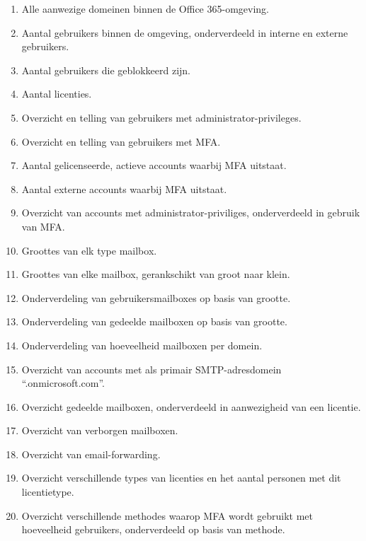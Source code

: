 \begin{enumerate}
    \item Alle aanwezige domeinen binnen de Office 365-omgeving.
    \item Aantal gebruikers binnen de omgeving, onderverdeeld in interne en externe gebruikers.
    \item Aantal gebruikers die geblokkeerd zijn.
    \item Aantal licenties.
    \item Overzicht en telling van gebruikers met administrator-privileges.
    \item Overzicht en telling van gebruikers met \ac{MFA}.
    \item Aantal gelicenseerde, actieve accounts waarbij \ac{MFA} uitstaat.
    \item Aantal externe accounts waarbij \ac{MFA} uitstaat.
    \item Overzicht van accounts met administrator-priviliges, onderverdeeld in gebruik van \ac{MFA}.
    \item Groottes van elk type mailbox.
    \item Groottes van elke mailbox, gerankschikt van groot naar klein.
    \item Onderverdeling van gebruikersmailboxes op basis van grootte.
    \item Onderverdeling van gedeelde mailboxen op basis van grootte.
    \item Onderverdeling van hoeveelheid mailboxen per domein.
    \item Overzicht van accounts met als primair \Ac{SMTP}-adresdomein “.onmicrosoft.com”.
    \item Overzicht gedeelde mailboxen, onderverdeeld in aanwezigheid van een licentie.
    \item Overzicht van verborgen mailboxen.
    \item Overzicht van email-forwarding.
    \item Overzicht verschillende types van licenties en het aantal personen met dit licentietype.
    \item Overzicht verschillende methodes waarop \ac{MFA} wordt gebruikt met hoeveelheid gebruikers, onderverdeeld op basis van methode.
\end{enumerate}

